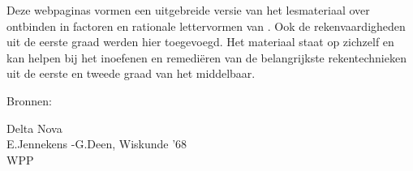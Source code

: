 \documentclass{ximera}
\begin{document}
	\author{Wiskundeplan}


 Deze webpaginas vormen een uitgebreide versie van het lesmateriaal over ontbinden in factoren en rationale lettervormen van . 
 Ook de rekenvaardigheden uit de eerste graad werden hier toegevoegd. Het materiaal staat op zichzelf en kan helpen bij het inoefenen en remediëren van de belangrijkste rekentechnieken uit de eerste en tweede graad van het middelbaar.  



 Bronnen: 

Delta Nova\\
E.Jennekens -G.Deen, Wiskunde '68\\
WPP\\
\end{document}
